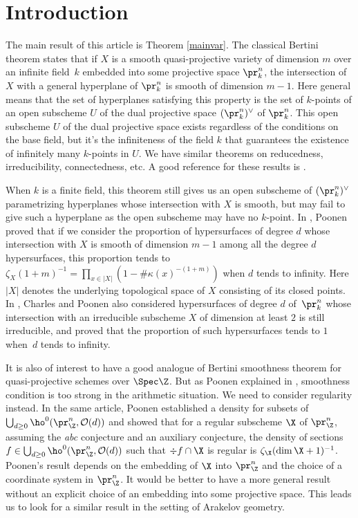 \section{Introduction}
The main result of this article is Theorem \ref{mainvar}.
The classical Bertini theorem states that if $X$ is a smooth quasi-projective variety of dimension $m$ over an infinite field~$k$ embedded into some projective space $\pr^n_k$, the intersection of $X$ with a general hyper\-plane of $\pr^n_k$ is smooth of dimension $m-1$. Here general means that the set of hyper\-planes satisfying this property is the set of $k$-points of an open subscheme $U$ of the dual projective space $(\pr^n_k)^{\vee}$ of $\pr^n_k$.
This open subscheme $U$ of the dual projective space exists regardless of the conditions on the base field, but it's the infiniteness of the field $k$ that guarantees the existence of infinitely many $k$-points in $U$. We have similar theorems on reducedness, irreducibility, connectedness, etc. A good reference for these results is \cite{Jo83}.

When $k$ is a finite field, this theorem still gives us an open subscheme of $(\pr^n_k)^{\vee}$ parametrizing hyperplanes whose intersection with $X$ is smooth, but may fail to give such a hyperplane as the open subscheme may have no $k$-point. In \cite{Po04}, Poonen proved that if we consider the proportion of hypersurfaces of degree $d$ whose intersection with $X$ is smooth of dimension $m-1$ among all the degree $d$ hypersurfaces, this proportion tends to $\zeta_X(1+m)^{-1}=\prod_{x\in |X|}(1-\#\kappa(x)^{-(1+m)})$ when $d$ tends to infinity. Here $|X|$ denotes the underlying topological space of $X$ consisting of its closed points. In \cite{CP16}, Charles and Poonen also considered hypersurfaces of degree $d$ of~$\pr^n_k$ whose intersection with an irreducible subscheme $X$ of dimension at least $2$ is still irreducible, and proved that the proportion of such hypersurfaces tends to $1$ when~$d$ tends to infinity.

It is also of interest to have a good analogue of Bertini smoothness theorem for quasi-projective schemes over $\Spec \Z$. But as Poonen explained in \cite[\S 5.7]{Po04}, smoothness condition is too strong in the arithmetic situation. We need to consider regularity instead.
In the same article, Poonen established a density for subsets of $\bigcup_{d\geq 0}\ho^0(\pr^n_{\Z}, \mathcal{O}(d))$ and showed that for a regular subscheme $\X$ of $\pr^n_{\Z}$, assum\-ing the \emph{abc} conjecture and an auxiliary conjecture, the density of sections $f\in\bigcup_{d\geq 0}\ho^0(\pr^n_{\Z}, \mathcal{O}(d))$ such that $\div f\cap \X$ is regular is $\zeta_{\X}(\dim \X+1)^{-1}$. Poonen's result depends on the embedding of $\X$ into $\pr^n_{\Z}$ and the choice of a coordinate system in $\pr^n_{\Z}$. It would be better to have a more general result without an explicit choice of an embedding into some projective space. This leads us to look for a similar result in the setting of Arakelov geometry.

